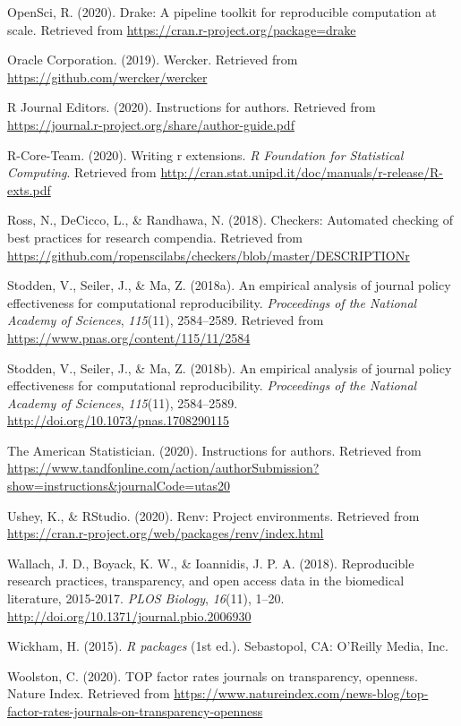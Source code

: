\documentclass[12pt,twoside]{reedthesis}
\begin{document}
\hypertarget{ref-R-drake}{}
OpenSci, R. (2020). Drake: A pipeline toolkit for reproducible
computation at scale. Retrieved from
\url{https://cran.r-project.org/package=drake}

\hypertarget{ref-wercker}{}
Oracle Corporation. (2019). Wercker. Retrieved from
\url{https://github.com/wercker/wercker}

\hypertarget{ref-r-journal}{}
R Journal Editors. (2020). Instructions for authors. Retrieved from
\url{https://journal.r-project.org/share/author-guide.pdf}

\hypertarget{ref-coreteam-extensions}{}
R-Core-Team. (2020). Writing r extensions. \emph{R Foundation for
Statistical Computing}. Retrieved from
\url{http://cran.stat.unipd.it/doc/manuals/r-release/R-exts.pdf}

\hypertarget{ref-R-checkers}{}
Ross, N., DeCicco, L., \& Randhawa, N. (2018). Checkers: Automated
checking of best practices for research compendia. Retrieved from
\url{https://github.com/ropenscilabs/checkers/blob/master/DESCRIPTIONr}

\hypertarget{ref-policy-effectiveness}{}
Stodden, V., Seiler, J., \& Ma, Z. (2018a). An empirical analysis of
journal policy effectiveness for computational reproducibility.
\emph{Proceedings of the National Academy of Sciences}, \emph{115}(11),
2584--2589. Retrieved from
\url{https://www.pnas.org/content/115/11/2584}

\hypertarget{ref-Stodden2584}{}
Stodden, V., Seiler, J., \& Ma, Z. (2018b). An empirical analysis of
journal policy effectiveness for computational reproducibility.
\emph{Proceedings of the National Academy of Sciences}, \emph{115}(11),
2584--2589. \url{http://doi.org/10.1073/pnas.1708290115}

\hypertarget{ref-ams-guide}{}
The American Statistician. (2020). Instructions for authors. Retrieved
from
\url{https://www.tandfonline.com/action/authorSubmission?show=instructions\&journalCode=utas20}

\hypertarget{ref-R-renv}{}
Ushey, K., \& RStudio. (2020). Renv: Project environments. Retrieved
from \url{https://cran.r-project.org/web/packages/renv/index.html}

\hypertarget{ref-plos-biology}{}
Wallach, J. D., Boyack, K. W., \& Ioannidis, J. P. A. (2018).
Reproducible research practices, transparency, and open access data in
the biomedical literature, 2015-2017. \emph{PLOS Biology},
\emph{16}(11), 1--20. \url{http://doi.org/10.1371/journal.pbio.2006930}

\hypertarget{ref-hadley-packages}{}
Wickham, H. (2015). \emph{R packages} (1st ed.). Sebastopol, CA:
O'Reilly Media, Inc.

\hypertarget{ref-top-guidelines}{}
Woolston, C. (2020). TOP factor rates journals on transparency,
openness. Nature Index. Retrieved from
\url{https://www.natureindex.com/news-blog/top-factor-rates-journals-on-transparency-openness}


\end{document}

